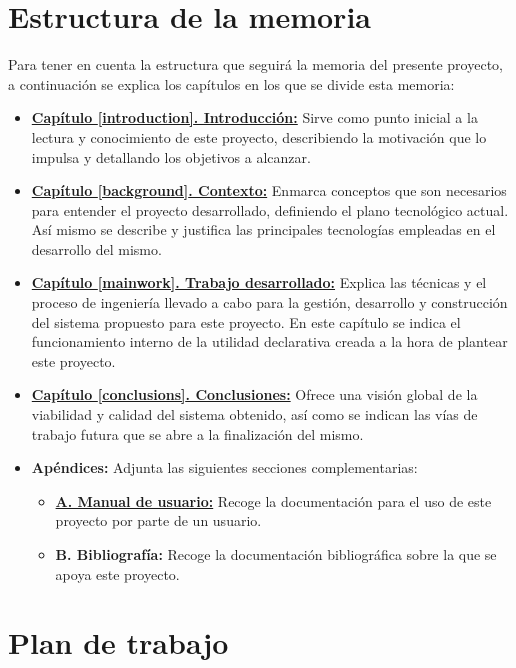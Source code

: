 \section{Estructura de la memoria}

Para tener en cuenta la estructura que seguirá la memoria del presente proyecto, a continuación se explica los capítulos en los que se divide esta memoria:

\begin{itemize}
	\item \textbf{\hyperlink{introduccion}{Capítulo \ref*{introduction}. Introducción:}} Sirve como punto inicial a la lectura y conocimiento de este proyecto, describiendo la motivación que lo impulsa y detallando los objetivos a alcanzar.
	\item \textbf{\hyperlink{background}{Capítulo \ref*{background}. Contexto:}} Enmarca conceptos que son necesarios para entender el proyecto desarrollado, definiendo el plano tecnológico actual. Así mismo se describe y justifica las principales tecnologías empleadas en el desarrollo del mismo.
	\item \textbf{\hyperlink{mainwork}{Capítulo \ref*{mainwork}. Trabajo desarrollado:}} Explica las técnicas y el proceso de ingeniería llevado a cabo para la gestión, desarrollo y construcción del sistema propuesto para este proyecto. En este capítulo se indica el funcionamiento interno de la utilidad declarativa creada a la hora de plantear este proyecto.
	\item \textbf{\hyperlink{conclusions}{Capítulo \ref*{conclusions}. Conclusiones:}} Ofrece una visión global de la viabilidad y calidad del sistema obtenido, así como se indican las vías de trabajo futura que se abre a la finalización del mismo.
	\item \textbf{Apéndices:} Adjunta las siguientes secciones complementarias:
	\begin{itemize}
		\item \textbf{\hyperlink{manual}{A. Manual de usuario:}} Recoge la documentación para el uso de este proyecto por parte de un usuario.
		\item \textbf{B. Bibliografía:} Recoge la documentación bibliográfica sobre la que se apoya este proyecto.
	\end{itemize}
\end{itemize}

\newpage

\section{Plan de trabajo}

